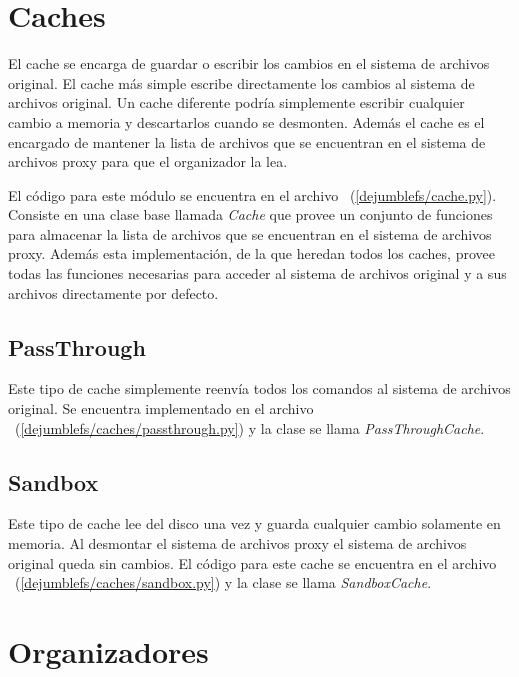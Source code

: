 \section{Caches}

El cache se encarga de guardar o escribir los cambios en el sistema de archivos original. El cache más simple escribe directamente los cambios al sistema de archivos original. Un cache diferente podría simplemente escribir cualquier cambio a memoria y descartarlos cuando se desmonten. Además el cache es el encargado de mantener la lista de archivos que se encuentran en el sistema de archivos proxy para que el organizador la lea.


El código para este módulo se encuentra en el archivo ~(\ref{dejumblefs/cache.py}). Consiste en una clase base llamada \textit{Cache} que provee un conjunto de funciones para almacenar la lista de archivos que se encuentran en el sistema de archivos proxy. Además esta implementación, de la que heredan todos los caches, provee todas las funciones necesarias para acceder al sistema de archivos original y a sus archivos directamente por defecto.

\subsection{PassThrough}

Este tipo de cache simplemente reenvía todos los comandos al sistema de archivos original. Se encuentra implementado en el archivo ~(\ref{dejumblefs/caches/passthrough.py}) y la clase se llama \textit{PassThroughCache}.

\subsection{Sandbox}

Este tipo de cache lee del disco una vez y guarda cualquier cambio solamente en memoria. Al desmontar el sistema de archivos proxy el sistema de archivos original queda sin cambios. El código para este cache se encuentra en el archivo ~(\ref{dejumblefs/caches/sandbox.py}) y la clase se llama \textit{SandboxCache}.


\section{Organizadores}

